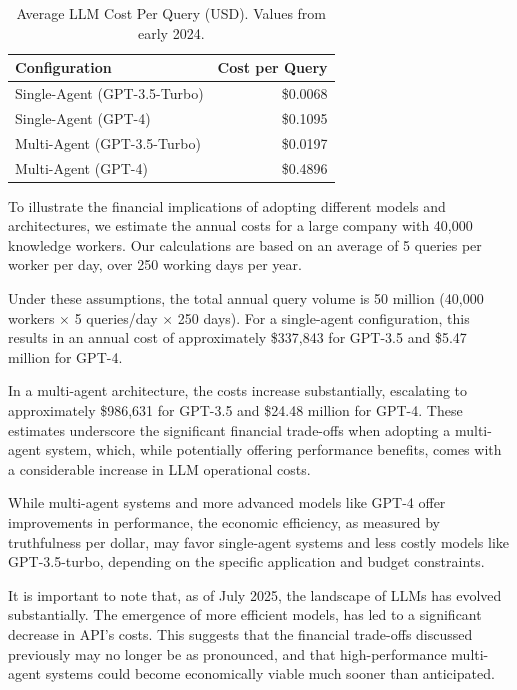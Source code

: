                 \begin{table}[h!]
                \centering
                \caption{Average LLM Cost Per Query (USD). Values from early 2024.}
                \label{tab:cost_per_query}
                \begin{tabular}{l r}
                \toprule
                \textbf{Configuration} & \textbf{Cost per Query} \\
                \midrule
                Single-Agent (GPT-3.5-Turbo) & \$0.0068 \\
                Single-Agent (GPT-4) & \$0.1095 \\
                Multi-Agent (GPT-3.5-Turbo) & \$0.0197 \\
                Multi-Agent (GPT-4) & \$0.4896 \\
                \bottomrule
                \end{tabular}
                \end{table}

                To illustrate the financial implications of adopting different models and architectures, we estimate the annual costs for a large company with 40,000 knowledge workers. Our calculations are based on an average of 5 queries per worker per day, over 250 working days per year.
                
                Under these assumptions, the total annual query volume is 50 million (40,000 workers $\times$ 5 queries/day $\times$ 250 days). For a single-agent configuration, this results in an annual cost of approximately \$337,843 for GPT-3.5 and \$5.47 million for GPT-4.
                
                In a multi-agent architecture, the costs increase substantially, escalating to approximately \$986,631 for GPT-3.5 and \$24.48 million for GPT-4. These estimates underscore the significant financial trade-offs when adopting a multi-agent system, which, while potentially offering performance benefits, comes with a considerable increase in LLM operational costs.

                While multi-agent systems and more advanced models like GPT-4 offer improvements in performance, the economic efficiency, as measured by truthfulness per dollar, may favor single-agent systems and less costly models like GPT-3.5-turbo, depending on the specific application and budget constraints.

                It is important to note that, as of July 2025, the landscape of LLMs has evolved substantially. The emergence of more efficient models, has led to a significant decrease in API's costs. This suggests that the financial trade-offs discussed previously may no longer be as pronounced, and that high-performance multi-agent systems could become economically viable much sooner than anticipated.

